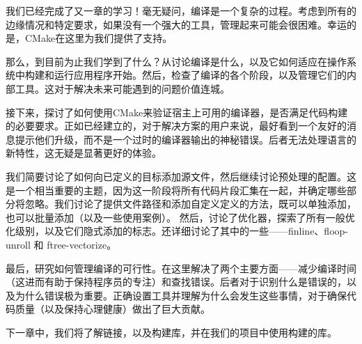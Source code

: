 我们已经完成了又一章的学习！毫无疑问，编译是一个复杂的过程。考虑到所有的边缘情况和特定要求，如果没有一个强大的工具，管理起来可能会很困难。幸运的是，CMake在这里为我们提供了支持。

那么，到目前为止我们学到了什么？从讨论编译是什么，以及它如何适应在操作系统中构建和运行应用程序开始。然后，检查了编译的各个阶段，以及管理它们的内部工具。这对于解决未来可能遇到的问题价值连城。

接下来，探讨了如何使用CMake来验证宿主上可用的编译器，是否满足代码构建的必要要求。正如已经建立的，对于解决方案的用户来说，最好看到一个友好的消息提示他们升级，而不是一个过时的编译器输出的神秘错误。后者无法处理语言的新特性，这无疑是显著更好的体验。

我们简要讨论了如何向已定义的目标添加源文件，然后继续讨论预处理的配置。这是一个相当重要的主题，因为这一阶段将所有代码片段汇集在一起，并确定哪些部分将忽略。我们讨论了提供文件路径和添加自定义定义的方法，既可以单独添加，也可以批量添加（以及一些使用案例）。 然后，讨论了优化器，探索了所有一般优化级别，以及它们隐式添加的标志。还详细讨论了其中的一些——finline、floop-unroll 和 ftree-vectorize。

最后，研究如何管理编译的可行性。在这里解决了两个主要方面——减少编译时间（这进而有助于保持程序员的专注）和查找错误。后者对于识别什么是错误的，以及为什么错误极为重要。正确设置工具并理解为什么会发生这些事情，对于确保代码质量（以及保持心理健康）做出了巨大贡献。

下一章中，我们将了解链接，以及构建库，并在我们的项目中使用构建的库。